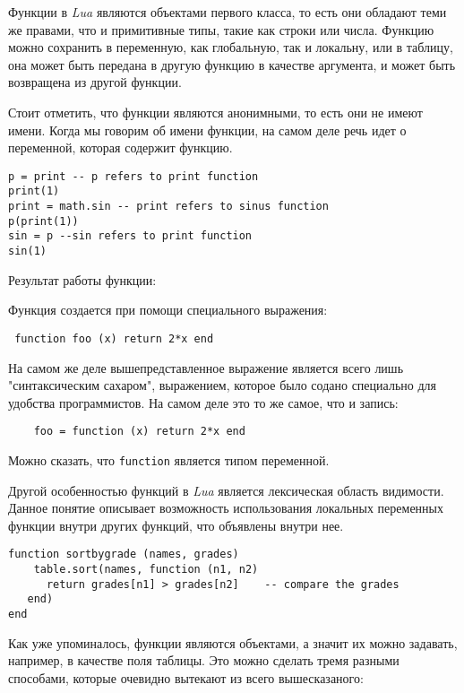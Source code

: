 Функции в \emph{Lua} являются объектами первого класса, то есть они обладают теми же правами, что и примитивные типы, такие как строки или числа. Функцию можно сохранить в переменную, как глобальную, так и локальну, или в таблицу, она может быть передана в другую функцию в качестве аргумента, и может быть возвращена из другой функции.

Стоит отметить, что функции являются анонимными, то есть они не имеют имени. Когда мы говорим об имени функции, на самом деле речь идет о переменной, которая содержит функцию. 

\begin{lstlisting}
p = print -- p refers to print function
print(1)
print = math.sin -- print refers to sinus function
p(print(1))
sin = p --sin refers to print function
sin(1)
\end{lstlisting}

Результат работы функции:

Функция создается при помощи специального выражения:
\begin{lstlisting}
 function foo (x) return 2*x end
\end{lstlisting}

На самом же деле вышепредставленное выражение является всего лишь "синтаксическим сахаром", выражением, которое было содано специально для удобства программистов. На самом деле это то же самое, что и запись:

\begin{lstlisting}
	foo = function (x) return 2*x end
\end{lstlisting}

Можно сказать, что \lstinline{function} является типом переменной. 

Другой особенностью функций в \emph{Lua} является лексическая область видимости. Данное понятие описывает возможность использования локальных переменных функции внутри других функций, что объявлены внутри нее.

\begin{lstlisting}
function sortbygrade (names, grades)
    table.sort(names, function (n1, n2)
      return grades[n1] > grades[n2]    -- compare the grades
   end)
end
\end{lstlisting}  



Как уже упоминалось, функции являются объектами, а значит их можно задавать, например, в качестве поля таблицы. Это можно сделать тремя разными способами, которые очевидно вытекают из всего вышесказаного:

